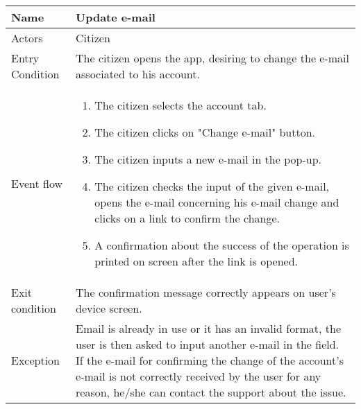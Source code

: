 \vskip 0.2in
\begin{tabular}{|p{3.7cm}|p{11cm}|}
	\hline
	Name & Update e-mail\\
	\hline
	Actors & Citizen\\
	\hline
	Entry Condition & The citizen opens the app, desiring to change the e-mail associated to his account.\\
	\hline
	Event flow & \begin{enumerate}
		\item The citizen selects the account tab.
		\item The citizen clicks on "Change e-mail" button.
		\item The citizen inputs a new e-mail in the pop-up.
		\item The citizen checks the input of the given e-mail, opens the e-mail concerning his e-mail change and clicks on a link to confirm the change.
		\item A confirmation about the success of the operation is printed on screen after the link is opened.
	\end{enumerate}\\
	\hline
	Exit condition & The confirmation message correctly appears on user's device screen.\\
	\hline
	Exception & Email is already in use or it has an invalid format, the user is then asked to input another e-mail in the field. If the e-mail for confirming the change of the account's e-mail is not correctly received by the user for any reason, he/she can contact the support about the issue.\\
	\hline
\end{tabular}